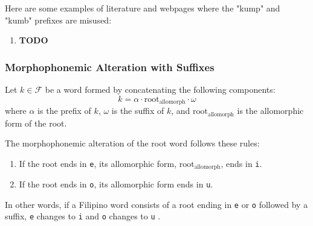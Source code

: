 \begin{example}
      Here are some examples of literature and webpages where the "kump" and "kumb"
      prefixes are misused:
\end{example}
\begin{enumerate}
      \item \textbf{TODO}
\end{enumerate}

\subsubsection{Morphophonemic Alteration with Suffixes}

Let \( k \in \mathcal{F} \) be a word formed by concatenating the following components:  
\[
k = \alpha \cdot \text{root}_\text{allomorph} \cdot \omega
\]
where \( \alpha \) is the prefix of \( k \), \( \omega \) is the suffix of \( k \), and \( \text{root}_\text{allomorph} \) is the allomorphic form of the root.  

The morphophonemic alteration of the root word follows these rules:  
\begin{enumerate}  
      \item If the root ends in \texttt{e}, its allomorphic form, \( \text{root}_\text{allomorph} \), ends in \texttt{i}.  
      \item If the root ends in \texttt{o}, its allomorphic form ends in \texttt{u}.  
\end{enumerate}  

In other words, if a Filipino word consists of a root ending in \texttt{e} or \texttt{o} followed by a suffix, \texttt{e} changes to \texttt{i} and \texttt{o} changes to \texttt{u} \cite{Yap_1967}.  


